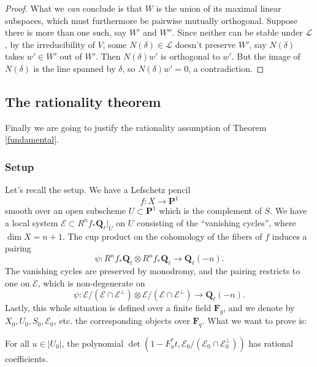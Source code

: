 \documentclass[letterpaper,11pt]{article}
\newcommand{\F}{\mathbf{F}}
\newcommand{\Q}{\mathbf{Q}}
\newcommand{\PS}{\mathbf{P}}
\newcommand{\Cal}[1]{\mathcal{#1}}
\begin{document}
\begin{proof}
What we \emph{can} conclude is that $W$ is the union of its maximal linear subspaces, which must furthermore be pairwise mutually orthogonal. Suppose there is more than one such, say $W'$ and $W''$. Since neither can be stable under $\Cal{L}$, by the irreducibility of $V$, some $N(\delta) \in \Cal{L}$ doesn't preserve $W'$, say $N(\delta) $ takes $w' \in W'$ out of $W'$. Then $N(\delta) w'$ is orthogonal to $w'$. But the image of $N(\delta)$ is the line spanned by $\delta$, so $N(\delta) w' = 0$, a contradiction. 


\end{proof}


\subsection{The rationality theorem}
Finally we are going to justify the rationality assumption of Theorem \ref{fundamental}. 


\subsubsection{Setup} Let's recall the setup. We have a Lefschetz pencil 
\[
f \colon X \rightarrow \PS^1
\]
smooth over an open subscheme $U \subset \PS^1$ which is the complement of $S$. We have a local system $\Cal{E} \subset R^n f_* \Q_{\ell}|_U$ on $U$ consisting of the ``vanishing cycles'', where $\dim X = n+1$. The cup product on the cohomology of the fibers of $f$ induces a pairing
\[
\psi \colon R^n f_* \Q_{\ell} \otimes R^n f_* \Q_{\ell} \rightarrow \Q_{\ell}(-n).
\]
The vanishing cycles are preserved by monodromy, and the pairing restricts to one on $\Cal{E}$, which is non-degenerate on 
\[
\psi \colon \Cal{E}/(\Cal{E} \cap \Cal{E}^{\perp}) \otimes \Cal{E}/(\Cal{E} \cap \Cal{E}^{\perp}) \rightarrow \Q_{\ell}(-n).
\]
Lastly, this whole situation is defined over a finite field $\F_q$, and we denote by $X_0, U_0, S_0, \Cal{E}_0$, etc. the corresponding objects over $\F_q$. What we want to prove is:

\begin{thm}\label{rationality}
For all $u \in |U_0|$, the polynomial $\det (1-F_u^* t, \Cal{E}_0/(\Cal{E}_0 \cap \Cal{E}_0^{\perp}))$ has rational coefficients. 
\end{thm}
\end{document}
